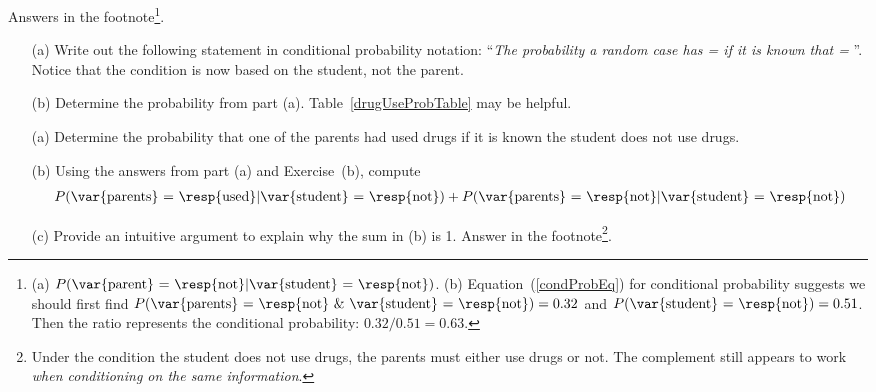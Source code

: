\begin{exercise}\label{drugUseProbOfParentsEqualNotGivenStudents}
Answers in the footnote\footnote{(a) $P(\text{\var{parent} = \resp{not}} | \text{\var{student} = \resp{not}})$. (b) Equation~(\ref{condProbEq}) for conditional probability suggests we should first find $P(\text{\var{parents} = \resp{not} \& \var{student} = \resp{not}})=0.32$ and $P(\text{\var{student} = \resp{not}})=0.51$. Then the ratio represents the conditional probability: $0.32/0.51 = 0.63$.}.\vspace{-1.5mm}
\begin{enumerate}
\item[(a)] Write out the following statement in conditional probability notation: ``\emph{The probability a random case has  =  if it is known that  = }''.  Notice that the condition is now based on the {student}, not the {parent}.
\item[(b)] Determine the probability from part (a). Table~\vref{drugUseProbTable} may be helpful.
\end{enumerate}
\end{exercise}

\begin{exercise}\label{whyCondProbSumTo1} \vspace{-1.5mm}
\begin{enumerate}
\setlength{\itemsep}{0mm}
\item[(a)] Determine the probability that one of the parents had used drugs if it is known the student does not use drugs. %
\item[(b)] Using the answers from part (a) and Exercise~(b), compute \vspace{-1.5mm}
\begin{eqnarray*}
P(\text{\var{parents} = \resp{used}}|\text{\var{student} = \resp{not}})
	+ P(\text{\var{parents} = \resp{not}}|\text{\var{student} = \resp{not}})
\end{eqnarray*}
\setlength{\itemsep}{-1.5mm}
\item[(c)] Provide an intuitive argument to explain why the sum in (b) is 1. Answer in the footnote\footnote{Under the condition the student does not use drugs, the parents must either use drugs or not. The complement still appears to work \emph{when conditioning on the same information}.}. \vspace{-1.5mm}
\end{enumerate}
\end{exercise}

